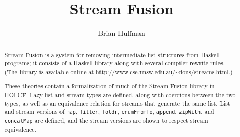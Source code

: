 \documentclass[11pt,a4paper]{article}
\begin{document}
\title{Stream Fusion}
\author{Brian Huffman}
\maketitle

\begin{abstract}
  Stream Fusion \cite{CLS07} is a system for removing intermediate
  list structures from Haskell programs; it consists of a Haskell
  library along with several compiler rewrite rules.  (The library is
  available online at
  \url{http://www.cse.unsw.edu.au/~dons/streams.html}.)

  These theories contain a formalization of much of the Stream Fusion
  library in HOLCF.  Lazy list and stream types are defined, along
  with coercions between the two types, as well as an equivalence
  relation for streams that generate the same list.  List and stream
  versions of \texttt{map}, \texttt{filter}, \texttt{foldr},
  \texttt{enumFromTo}, \texttt{append}, \texttt{zipWith}, and
  \texttt{concatMap} are defined, and the stream versions are shown to
  respect stream equivalence.
\end{abstract}

\tableofcontents





\end{document}
